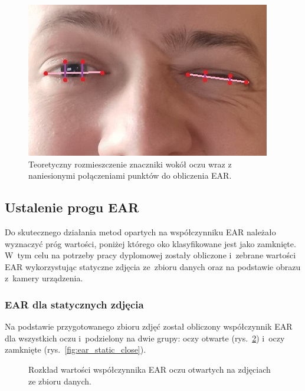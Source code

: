 \begin{figure}[!h]
    \begin{center}
        \includegraphics[scale=0.35]{img/landmark_section/theoretical_eye_landmarks.jpg}
        \caption{Teoretyczny rozmieszczenie znaczniki wokół oczu wraz z naniesionymi połączeniami punktów do obliczenia EAR.}
        \label{fig:theoretical_eye_landmarks}
    \end{center}
\end{figure}




\subsection{Ustalenie progu EAR}


Do skutecznego działania metod opartych na współczynniku EAR należało wyznaczyć próg wartości, poniżej którego oko klasyfikowane jest jako zamknięte. W~tym celu na potrzeby pracy dyplomowej zostały obliczone i~zebrane wartości EAR wykorzystując statyczne zdjęcia ze~zbioru danych oraz na podstawie obrazu z~kamery urządzenia. 


\subsubsection{EAR dla statycznych zdjęcia}

Na podstawie przygotowanego zbioru zdjęć został obliczony współczynnik EAR dla wszystkich oczu i~podzielony na dwie grupy: oczy otwarte (rys.~\ref{fig:ear_static_open}) i~oczy zamknięte (rys.~\ref{fig:ear_static_close}). 

\vspace{5mm}

\begin{figure}[!h]
    \centering
    \caption{Rozkład  wartości współczynnika EAR oczu otwartych na zdjęciach ze zbioru danych.}
    \label{fig:ear_static_open}
\end{figure}

